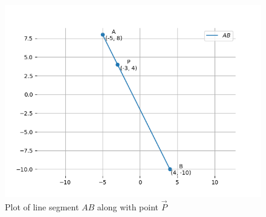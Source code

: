 \documentclass[journal]{IEEEtran}
\begin{document}
\begin{figure}[h]
    \centering
    \includegraphics[width=\columnwidth]{figs/fig.png}
    \caption{Plot of line segment $AB$ along with point $\vec{P}$}
 \end{figure}
\end{document}
